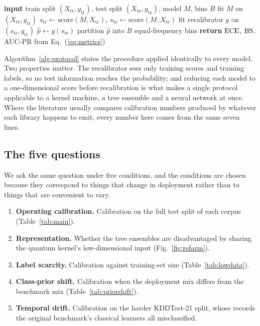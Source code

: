 \documentclass[journal]{IEEEtran}
\begin{document}
\begin{algorithm}[t]
\caption{Uniform probability and reliability protocol}
\label{alg:protocol}
\begin{algorithmic}[1]
\STATE \textbf{input} train split $(X_{\mathrm{tr}},y_{\mathrm{tr}})$, test
       split $(X_{\mathrm{te}},y_{\mathrm{te}})$, model $M$, bins $B$
\STATE fit $M$ on $(X_{\mathrm{tr}},y_{\mathrm{tr}})$
\STATE $s_{\mathrm{tr}} \leftarrow \mathrm{score}(M,X_{\mathrm{tr}})$,\;
       $s_{\mathrm{te}} \leftarrow \mathrm{score}(M,X_{\mathrm{te}})$
\STATE fit recalibrator $g$ on $(s_{\mathrm{tr}},y_{\mathrm{tr}})$
\STATE $\hat p \leftarrow g(s_{\mathrm{te}})$
\STATE partition $\hat p$ into $B$ equal-frequency bins
\STATE \textbf{return} $\mathrm{ECE}$, $\mathrm{BS}$, AUC-PR from
       Eq.~(\ref{eq:metrics})
\end{algorithmic}
\end{algorithm}

Algorithm~\ref{alg:protocol} states the procedure applied identically to
every model. Two properties matter. The recalibrator sees only training
scores and training labels, so no test information reaches the probability;
and reducing each model to a one-dimensional score before recalibration is
what makes a single protocol applicable to a kernel machine, a tree ensemble
and a neural network at once. Where the literature usually compares
calibration numbers produced by whatever each library happens to emit, every
number here comes from the same seven lines.

\subsection{The five questions}
We ask the same question under five conditions, and the conditions are
chosen because they correspond to things that change in deployment rather
than to things that are convenient to vary.

\begin{enumerate}
  \item \textbf{Operating calibration.} Calibration on the full test split
        of each corpus (Table~\ref{tab:main}).
  \item \textbf{Representation.} Whether the tree ensembles are
        disadvantaged by sharing the quantum kernel's low-dimensional input
        (Fig.~\ref{fig:refarm}).
  \item \textbf{Label scarcity.} Calibration against training-set size
        (Table~\ref{tab:lowdata}).
  \item \textbf{Class-prior shift.} Calibration when the deployment mix
        differs from the benchmark mix (Table~\ref{tab:priorshift}).
  \item \textbf{Temporal drift.} Calibration on the harder KDDTest-21
        split, whose records the original benchmark's classical learners
        all misclassified.
\end{enumerate}
\end{document}
